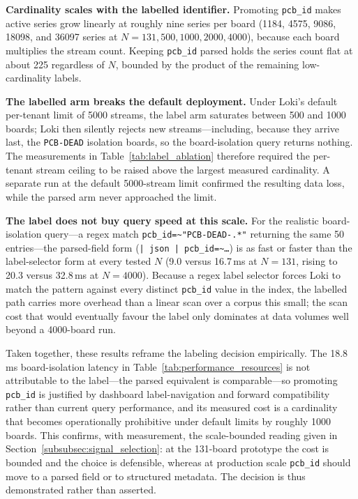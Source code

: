 \documentclass[12pt,a4paper]{article}
\begin{document}
\textbf{Cardinality scales with the labelled identifier.} Promoting \texttt{pcb\_id}
makes active series grow linearly at roughly nine series per board (1184, 4575,
9086, 18098, and 36097 series at $N=131,500,1000,2000,4000$), because each board
multiplies the stream count. Keeping \texttt{pcb\_id} parsed holds the series count
flat at about 225 regardless of $N$, bounded by the product of the remaining
low-cardinality labels.

\textbf{The labelled arm breaks the default deployment.} Under Loki's default
per-tenant limit of 5000 streams, the label arm saturates between 500 and 1000
boards; Loki then silently rejects new streams---including, because they arrive
last, the \texttt{PCB-DEAD} isolation boards, so the board-isolation query returns
nothing. The measurements in Table~\ref{tab:label_ablation} therefore required the
per-tenant stream ceiling to be raised above the largest measured cardinality.
A separate run at the default 5000-stream limit confirmed the resulting data
loss, while the parsed arm never approached the limit.

\textbf{The label does not buy query speed at this scale.} For the realistic
board-isolation query---a regex match \texttt{pcb\_id=\textasciitilde"PCB-DEAD-.*"}
returning the same 50 entries---the parsed-field form
(\texttt{| json | pcb\_id=\textasciitilde\ldots}) is as fast or faster than the
label-selector form at every tested $N$ (9.0 versus 16.7\,ms at $N=131$, rising to
20.3 versus 32.8\,ms at $N=4000$). Because a regex label selector forces Loki to
match the pattern against every distinct \texttt{pcb\_id} value in the index, the
labelled path carries more overhead than a linear scan over a corpus this small;
the scan cost that would eventually favour the label only dominates at data volumes
well beyond a 4000-board run.

Taken together, these results reframe the labeling decision empirically. The
18.8\,ms board-isolation latency in Table~\ref{tab:performance_resources} is not
attributable to the label---the parsed equivalent is comparable---so promoting
\texttt{pcb\_id} is justified by dashboard label-navigation and forward
compatibility rather than current query performance, and its measured cost is a
cardinality that becomes operationally prohibitive under default limits by roughly
1000 boards. This confirms, with measurement, the scale-bounded reading given in
Section~\ref{subsubsec:signal_selection}: at the 131-board prototype the cost is
bounded and the choice is defensible, whereas at production scale \texttt{pcb\_id}
should move to a parsed field or to structured metadata. The decision is thus
demonstrated rather than asserted.
\end{document}
